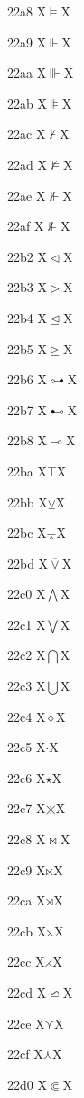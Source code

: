 \documentclass[11pt]{article}
\begin{document}
22a8 X{\ensuremath{\vDash}}X

22a9 X{\ensuremath{\Vdash}}X

22aa X{\ensuremath{\Vvdash}}X

22ab X{\ensuremath{\VDash}}X

22ac X{\ensuremath{\nvdash}}X

22ad X{\ensuremath{\nvDash}}X

22ae X{\ensuremath{\nVdash}}X

22af X{\ensuremath{\nVDash}}X

22b2 X{\ensuremath{\vartriangleleft}}X

22b3 X{\ensuremath{\vartriangleright}}X

22b4 X{\ensuremath{\trianglelefteq}}X

22b5 X{\ensuremath{\trianglerighteq}}X

22b6 X{\ensuremath{\multimapdotbothA}}X

22b7 X{\ensuremath{\multimapdotbothB}}X

22b8 X{\ensuremath{\multimap}}X

22ba X{\ensuremath{\intercal}}X

22bb X{\ensuremath{\veebar}}X

22bc X{\ensuremath{\barwedge}}X

22bd X{\ensuremath{\overline{\vee}}}X

22c0 X{\ensuremath{\bigwedge}}X

22c1 X{\ensuremath{\bigvee}}X

22c2 X{\ensuremath{\bigcap}}X

22c3 X{\ensuremath{\bigcup}}X

22c4 X{\ensuremath{\diamond}}X

22c5 X{\ensuremath{\cdot}}X

22c6 X{\ensuremath{\star}}X

22c7 X{\ensuremath{\divideontimes}}X

22c8 X{\ensuremath{\bowtie}}X

22c9 X{\ensuremath{\ltimes}}X

22ca X{\ensuremath{\rtimes}}X

22cb X{\ensuremath{\leftthreetimes}}X

22cc X{\ensuremath{\rightthreetimes}}X

22cd X{\ensuremath{\backsimeq}}X

22ce X{\ensuremath{\curlyvee}}X

22cf X{\ensuremath{\curlywedge}}X

22d0 X{\ensuremath{\Subset}}X
\end{document}
